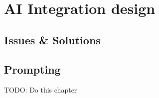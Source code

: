 \chapter{AI Integration design}

\label{cha:design}
\section{Issues \& Solutions}
\section{Prompting}



TODO: Do this chapter
